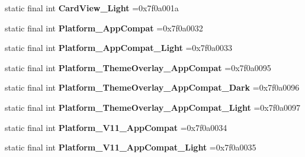 \begin{DoxyCompactItemize}
\mbox{\label{classproject4_1_1xaria_1_1R_1_1style_a82db04eecbde900029996a8c2cd5a63c}} 
static final int {\bfseries Card\+View\+\_\+\+Light} =0x7f0a001a
\item 
\mbox{\label{classproject4_1_1xaria_1_1R_1_1style_ab51f620a73ac5df1f51fb84f9bb66c4e}} 
static final int {\bfseries Platform\+\_\+\+App\+Compat} =0x7f0a0032
\item 
\mbox{\label{classproject4_1_1xaria_1_1R_1_1style_a7fc3d3d595ad749d2cd7aeb4800f7d83}} 
static final int {\bfseries Platform\+\_\+\+App\+Compat\+\_\+\+Light} =0x7f0a0033
\item 
\mbox{\label{classproject4_1_1xaria_1_1R_1_1style_a083750d87d1652b63c983adc59928a28}} 
static final int {\bfseries Platform\+\_\+\+Theme\+Overlay\+\_\+\+App\+Compat} =0x7f0a0095
\item 
\mbox{\label{classproject4_1_1xaria_1_1R_1_1style_ae9d97a03146d4e552df988753f1b2385}} 
static final int {\bfseries Platform\+\_\+\+Theme\+Overlay\+\_\+\+App\+Compat\+\_\+\+Dark} =0x7f0a0096
\item 
\mbox{\label{classproject4_1_1xaria_1_1R_1_1style_a3db06a8c11f437cd89dc7590d23d71a9}} 
static final int {\bfseries Platform\+\_\+\+Theme\+Overlay\+\_\+\+App\+Compat\+\_\+\+Light} =0x7f0a0097
\item 
\mbox{\label{classproject4_1_1xaria_1_1R_1_1style_a13701e3baab916311cf949296530f73d}} 
static final int {\bfseries Platform\+\_\+\+V11\+\_\+\+App\+Compat} =0x7f0a0034
\item 
\mbox{\label{classproject4_1_1xaria_1_1R_1_1style_a01e4a1d8390618b46499c25b0e63118a}} 
static final int {\bfseries Platform\+\_\+\+V11\+\_\+\+App\+Compat\+\_\+\+Light} =0x7f0a0035
\item 
\mbox{\label{classproject4_1_1xaria_1_1R_1_1style_a1999402df88794ab40e432cd897cf5ba}} 

\end{DoxyCompactItemize}
